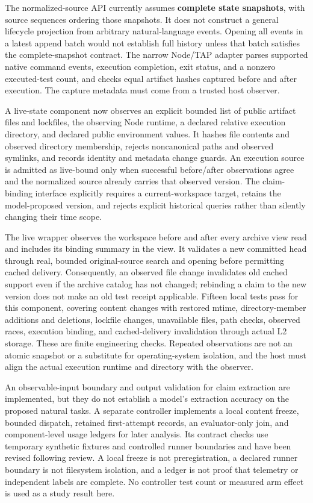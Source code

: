 \documentclass[
  11pt,
  a4paper,
]{article}
\begin{document}
The normalized-source API currently assumes \textbf{complete state
snapshots}, with source sequences ordering those snapshots. It does not
construct a general lifecycle projection from arbitrary natural-language
events. Opening all events in a latest append batch would not establish
full history unless that batch satisfies the complete-snapshot contract.
The narrow Node/TAP adapter parses supported native command events,
execution completion, exit status, and a nonzero executed-test count,
and checks equal artifact hashes captured before and after execution.
The capture metadata must come from a trusted host observer.

A live-state component now observes an explicit bounded list of public
artifact files and lockfiles, the observing Node runtime, a declared
relative execution directory, and declared public environment values. It
hashes file contents and observed directory membership, rejects
noncanonical paths and observed symlinks, and records identity and
metadata change guards. An execution source is admitted as live-bound
only when successful before/after observations agree and the normalized
source already carries that observed version. The claim-binding
interface explicitly requires a current-workspace target, retains the
model-proposed version, and rejects explicit historical queries rather
than silently changing their time scope.

The live wrapper observes the workspace before and after every archive
view read and includes its binding summary in the view. It validates a
new committed head through real, bounded original-source search and
opening before permitting cached delivery. Consequently, an observed
file change invalidates old cached support even if the archive catalog
has not changed; rebinding a claim to the new version does not make an
old test receipt applicable. Fifteen local tests pass for this
component, covering content changes with restored mtime,
directory-member additions and deletions, lockfile changes, unavailable
files, path checks, observed races, execution binding, and
cached-delivery invalidation through actual L2 storage. These are finite
engineering checks. Repeated observations are not an atomic snapshot or
a substitute for operating-system isolation, and the host must align the
actual execution runtime and directory with the observer.

An observable-input boundary and output validation for claim extraction
are implemented, but they do not establish a model's extraction accuracy
on the proposed natural tasks. A separate controller implements a local
content freeze, bounded dispatch, retained first-attempt records, an
evaluator-only join, and component-level usage ledgers for later
analysis. Its contract checks use temporary synthetic fixtures and
controlled runner boundaries and have been revised following review. A
local freeze is not preregistration, a declared runner boundary is not
filesystem isolation, and a ledger is not proof that telemetry or
independent labels are complete. No controller test count or measured
arm effect is used as a study result here.
\end{document}

